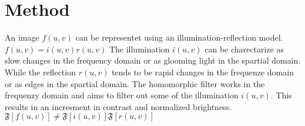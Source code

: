 \section{Method}

An image $f(u,v)$ can be representet using an illumination-reflection model. $f(u,v) = i(u,v) r(u,v)$
The illumination $i(u,v)$ can be charectarize as slow changes in the frequency domain or as glooming light in the spartial domain. While the reflection $r(u,v)$ tends to be rapid changes in the frequenze domain or as edges in the spartial domain. The homomorphic filter works in the frequenzy domain and aims to filter out some of the illumination $i(u,v)$. This results in an incresment in contrast and normalized brightness. 
\\


$\mathfrak{F}[f(u,v)] \neq \mathfrak{F}[i(u,v)] \mathfrak{F}[r(u,v)] $